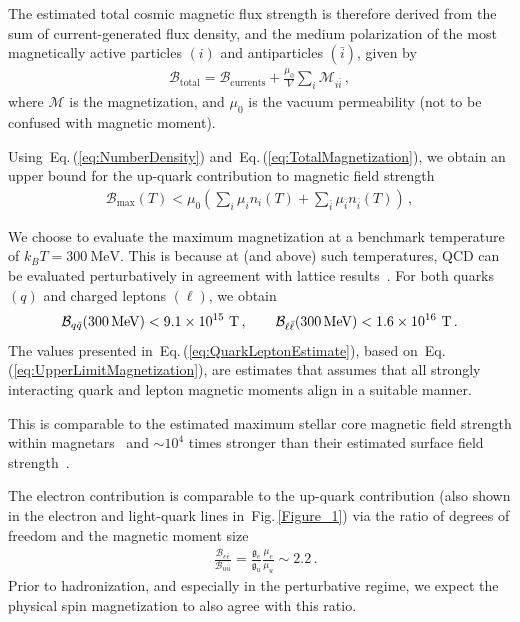\documentclass[epjST]{svjour}
\newcommand*{\MeV}{\text{\,MeV}}
\newcommand{\req}[1]{Eq.\,(\ref{#1})}
\newcommand{\rf}[1]{Fig.\,{\ref{#1}}}
\begin{document}
The estimated total cosmic magnetic flux strength is therefore derived from the sum of current-generated flux density, and the medium polarization of the most magnetically active particles \((i)\) and antiparticles \((\bar{i})\), given by
\begin{align}
\label{eq:TotalMagnetization}
\mathcal{B}_\mathrm{total}=\mathcal{B}_\mathrm{currents}+\frac{\mu_{0}}{V}\sum_{i} \mathcal{M}_{i\bar{i}}\,,
\end{align}
where \(\mathcal{M}\) is the magnetization, and \(\mu_{0}\) is the vacuum permeability (not to be confused with magnetic moment). {\color{blue}Using~\req{eq:NumberDensity} and~\req{eq:TotalMagnetization}, we obtain an upper bound for the up-quark contribution to magnetic field strength
\begin{align}
\label{eq:UpperLimitMagnetization}
\mathcal{B}_\mathrm{max}(T) < \mu_{0}\left(\sum_{i}\mu_{i}n_{i}(T)+\sum_{\bar{i}}\mu_{\bar{i}}n_{\bar{i}}(T)\right)\,,
\end{align}

We choose to evaluate the maximum magnetization at a benchmark temperature of \(k_{B}T=300~\mathrm{MeV}\). This is because at (and above) such temperatures, QCD can be evaluated perturbatively in agreement with lattice results~\cite{ParticleDataGroup:2024cfk}. For both quarks \((q)\) and charged leptons \((\ell)\), we obtain
\begin{equation}
\label{eq:QuarkLeptonEstimate}
\mathcal{B}_{q\bar{q}}(300\MeV) < 9.1\times10^{15}~\mathrm{T} \,,\qquad
\mathcal{B}_{\ell\bar{\ell}}(300\MeV) < 1.6\times10^{16}~\mathrm{T} \,.
\end{equation}
The values presented in~\req{eq:QuarkLeptonEstimate}, based on~\req{eq:UpperLimitMagnetization}, are estimates that assumes that all strongly interacting quark and lepton magnetic moments align in a suitable manner.} This is comparable to the estimated maximum stellar core magnetic field strength within magnetars~\cite{Ferrer:2010wz} and \(\sim 10^{4}\) times stronger than their estimated surface field strength~\cite{Kaspi:2017fwg}.


The electron contribution is comparable to the up-quark contribution (also shown in the electron and light-quark lines in~\rf{Figure_1}) via the ratio of degrees of freedom and the magnetic moment size
{\color{blue}\begin{align}
\label{eq:ElectronMagnetization}
&\frac{\mathcal{B}_{e\bar{e}}}{\mathcal{B}_{u\bar{u}}} = \frac{\mathfrak{g}_{e}}{\mathfrak{g}_{u}} \frac{\mu_{e}}{\mu_{u}} \sim 2.2\,.
\end{align}
Prior to hadronization, and especially in the perturbative regime, we expect the physical spin magnetization to also agree with this ratio.}
\end{document}
